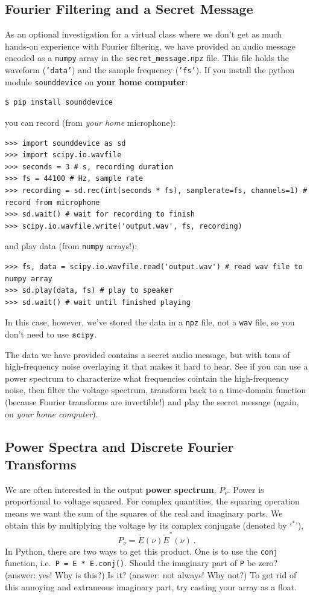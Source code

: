 \documentclass[11pt,preprint]{aastex}
\begin{document}
{\color{red}
\subsection{Fourier Filtering and a Secret Message}

As an optional investigation for a virtual class where we don't get as much hands-on experience
with Fourier filtering, we have provided an audio message encoded as a {\tt numpy} array in the 
{\tt secret\_message.npz} file. This file holds the waveform ({\tt 'data'}) and the sample
frequency ({\tt 'fs'}). If you install the python module {\tt sounddevice} on {\bf your home computer}:
\begin{verbatim}
$ pip install sounddevice
\end{verbatim}
you can record (from {\it your home} microphone):
\begin{verbatim}
>>> import sounddevice as sd
>>> import scipy.io.wavfile
>>> seconds = 3 # s, recording duration
>>> fs = 44100 # Hz, sample rate
>>> recording = sd.rec(int(seconds * fs), samplerate=fs, channels=1) # record from microphone
>>> sd.wait() # wait for recording to finish
>>> scipy.io.wavfile.write('output.wav', fs, recording)
\end{verbatim}
and play data (from {\tt numpy} arrays!):
\begin{verbatim}
>>> fs, data = scipy.io.wavfile.read('output.wav') # read wav file to numpy array
>>> sd.play(data, fs) # play to speaker
>>> sd.wait() # wait until finished playing
\end{verbatim}
In this case, however, we've stored the data in a {\tt npz} file, not a {\tt wav} file, so you
don't need to use $\tt scipy$.

The data we have provided contains a secret audio message, but with tons of high-frequency noise
overlaying it that makes it hard to hear. See if you can use a power spectrum to characterize
what frequencies cointain the high-frequency noise, then filter the voltage spectrum, transform
back to a time-domain function (because Fourier transforms are invertible!) and play the secret
message (again, on {\it your home computer}).}


\subsection{Power Spectra and Discrete Fourier Transforms} 
\label{pwrspect}

\noindent
We are often interested in the output {\bf power spectrum}, 
$P_\nu$.  Power is proportional to voltage squared.  For complex quantities, the squaring
operation means we want the sum of the squares of the real and imaginary
parts.  We obtain this by multiplying the voltage by its complex
conjugate (denoted by `$^*$'),
%
\begin{equation}
P_\nu = \tilde E(\nu) \tilde E^*(\nu) \ .
\end{equation}
% 
\noindent In Python, there are two ways to get this product.  One is to use
the \verb$conj$ function, i.e.\ {\tt P = E * E.conj()}.  Should the
imaginary part of \verb$P$ be zero? (answer: yes! Why is this?) Is it?
(answer: not always! Why not?) To get rid of this annoying and extraneous
imaginary part, try casting your array as a float.
 
\end{document}
